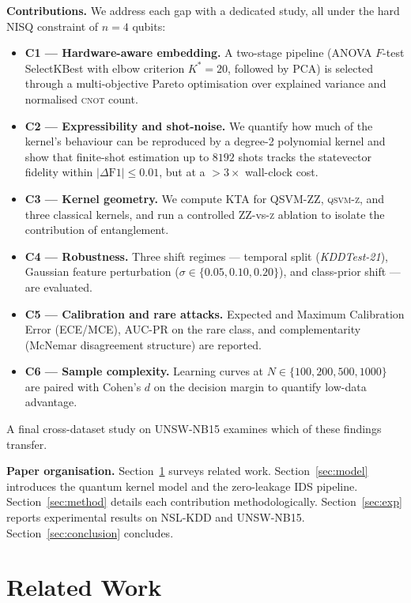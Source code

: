 \documentclass[journal]{IEEEtran}
\newcommand{\ZZ}{\textsc{ZZ}}
\newcommand{\QSVM}{QSVM-\ZZ}
\begin{document}
  \textbf{Contributions.} We address each gap with a dedicated study,
  all under the hard NISQ constraint of $n{=}4$ qubits:
  \begin{itemize}
  \item \textbf{C1 --- Hardware-aware embedding.} A two-stage pipeline
    (ANOVA $F$-test SelectKBest with elbow criterion $K^{*}{=}20$,
    followed by PCA) is selected through a multi-objective Pareto
    optimisation over explained variance and normalised \textsc{cnot}
    count.
  \item \textbf{C2 --- Expressibility and shot-noise.} We quantify how
    much of the kernel's behaviour can be reproduced by a degree-2
    polynomial kernel and show that finite-shot estimation up to
    $8192$ shots tracks the statevector fidelity within
    $|\Delta\mathrm{F1}|\le 0.01$, but at a $>3\!\times$ wall-clock
    cost.
  \item \textbf{C3 --- Kernel geometry.} We compute KTA for \QSVM{},
    \textsc{qsvm-z}, and three classical kernels, and run a controlled
    \ZZ{}-vs-\textsc{z} ablation to isolate the contribution of
    entanglement.
  \item \textbf{C4 --- Robustness.} Three shift regimes --- temporal
    split (\textit{KDDTest-21}), Gaussian feature perturbation
    ($\sigma\in\{0.05,0.10,0.20\}$), and class-prior shift --- are
    evaluated.
  \item \textbf{C5 --- Calibration and rare attacks.} Expected and
    Maximum Calibration Error (ECE/MCE), AUC-PR on the rare class, and
    complementarity (McNemar disagreement structure) are reported.
  \item \textbf{C6 --- Sample complexity.} Learning curves at
    $N\in\{100,200,500,1000\}$ are paired with Cohen's $d$ on the
    decision margin to quantify low-data advantage.
  \end{itemize}
  A final cross-dataset study on UNSW-NB15 examines which of these
  findings transfer.

  \textbf{Paper organisation.} Section~\ref{sec:related} surveys related
  work. Section~\ref{sec:model} introduces the quantum kernel model and
  the zero-leakage IDS pipeline. Section~\ref{sec:method} details each
  contribution methodologically. Section~\ref{sec:exp} reports
  experimental results on NSL-KDD and UNSW-NB15.
  Section~\ref{sec:conclusion} concludes.

  \section{Related Work}\label{sec:related}
\end{document}
